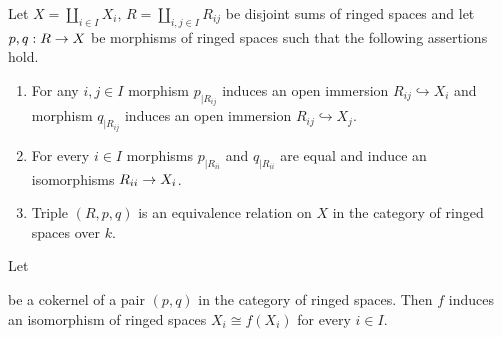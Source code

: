 \begin{theorem}\label{theorem:recollement}
Let $X = \coprod_{i\in I}X_i,\,R = \coprod_{i,j\in I}R_{ij}$ be disjoint sums of ringed spaces and let $p,q:R\rightarrow X$ be morphisms of ringed spaces such that the following assertions hold.
\begin{enumerate}[label=\emph{\textbf{(\arabic*)}}, leftmargin=1.5em]
\item For any $i,j\in I$ morphism $p_{\mid R_{ij}}$ induces an open immersion $R_{ij}\hookrightarrow X_i$ and morphism $q_{\mid R_{ij}}$ induces an open immersion $R_{ij}\hookrightarrow X_j$.
\item For every $i\in I$ morphisms $p_{\mid R_{ii}}$ and $q_{\mid R_{ii}}$ are equal and induce an isomorphisms $R_{ii}\rightarrow X_i$.  
\item Triple $\left(R,p,q\right)$ is an equivalence relation on $X$ in the category of ringed spaces over $k$.
\end{enumerate}
Let 
\begin{center}
\end{center}
be a cokernel of a pair $(p,q)$ in the category of ringed spaces. Then $f$ induces an isomorphism of ringed spaces $X_i \cong f(X_i)$ for every $i\in I$.
\end{theorem}

